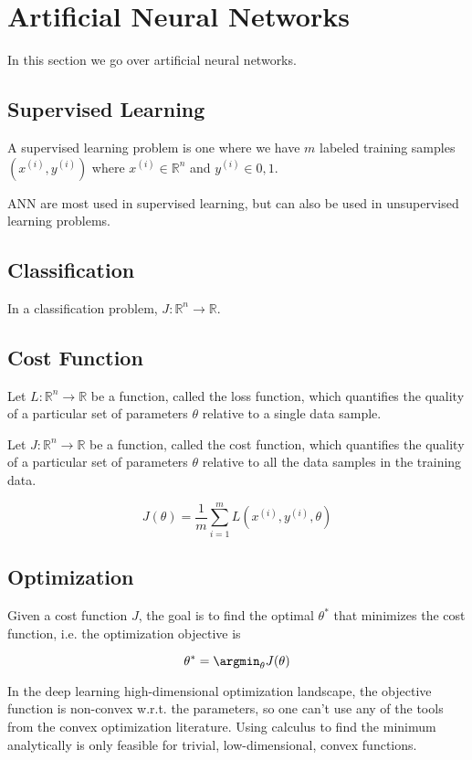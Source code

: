 \chapter{Artificial Neural Networks}
\label{chapter:ann}

In this section we go over artificial neural networks.

\section{Supervised Learning}

A supervised learning problem is one where we have $m$ labeled training samples $(x^{(i)}, y^{(i)})$ where $x^{(i)} \in \mathbb{R}^n$ and $y^{(i)} \in {0, 1}$.

\ac{ANN} are most used in supervised learning, but can also be used in unsupervised learning problems.

\section{Classification}

In a classification problem, $J \colon \mathbb{R}^n \to \mathbb{R}$.

\section{Cost Function}

Let $L \colon \mathbb{R}^n \to \mathbb{R}$ be a function, called the loss function, which quantifies the quality of a particular set of parameters $\theta$ relative to a single data sample.

Let $J \colon \mathbb{R}^n \to \mathbb{R}$ be a function, called the cost function, which quantifies the quality of a particular set of parameters $\theta$ relative to all the data samples in the training data.

$$
J(\theta) = \frac{1}{m} \sum_{i=1}^{m} L(x^{(i)}, y^{(i)}, \theta)
$$

\section{Optimization}

Given a cost function $J$, the goal is to find the optimal $\theta^*$ that minimizes the cost function, i.e. the optimization objective is 

$$
\theta^* = \argmin_{\theta} J(\theta)
$$

In the deep learning high-dimensional optimization landscape, the objective function is non-convex w.r.t. the parameters, so one can't use any of the tools from the convex optimization literature. Using calculus to find the minimum analytically is only feasible for trivial, low-dimensional, convex functions.

